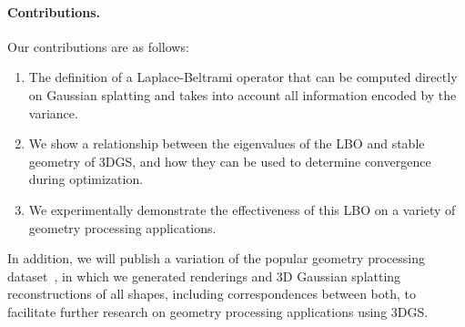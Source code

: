 \paragraph{Contributions. } Our contributions are as follows: 
\begin{enumerate}
    \item The definition of a Laplace-Beltrami operator that can be computed directly on Gaussian splatting and takes into account all information encoded by the variance. 
    \item We show a relationship between the eigenvalues of the LBO and stable geometry of 3DGS, and how they can be used to determine convergence during optimization. 
    \item We experimentally demonstrate the effectiveness of this LBO on a variety of geometry processing applications.
\end{enumerate}
In addition, we will publish a variation of the popular geometry processing dataset~\cite{MB08}, in which we generated renderings and 3D Gaussian splatting reconstructions of all shapes, including correspondences between both, to facilitate further research on geometry processing applications using 3DGS.

